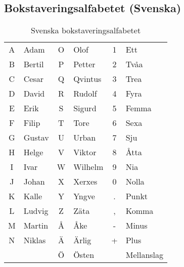 \subsection{Bokstaveringsalfabetet (Svenska)}

\begin{table}[H]
	\centering
\begin{longtable}{cl|cl|cl }
	A & Adam   & O & Olof    & 1 & Ett        \\
	B & Bertil & P & Petter  & 2 & Tvåa       \\
	C & Cesar  & Q & Qvintus & 3 & Trea       \\
	D & David  & R & Rudolf  & 4 & Fyra       \\
	E & Erik   & S & Sigurd  & 5 & Femma      \\
	F & Filip  & T & Tore    & 6 & Sexa       \\
	G & Gustav & U & Urban   & 7 & Sju        \\
	H & Helge  & V & Viktor  & 8 & Åtta       \\
	I & Ivar   & W & Wilhelm & 9 & Nia        \\
	J & Johan  & X & Xerxes  & 0 & Nolla      \\
	K & Kalle  & Y & Yngve   & . & Punkt      \\
	L & Ludvig & Z & Zäta    & , & Komma      \\
	M & Martin & Å & Åke     & - & Minus      \\
	N & Niklas & Ä & Ärlig   & + & Plus       \\
	  &        & Ö & Östen   &   & Mellanslag \\
\end{longtable}
\caption{Svenska bokstaveringsalfabetet}
\end{table}

